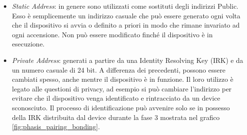 \begin{itemize}
    \item \textit{Static Address}: in genere sono utilizzati come sostituti degli indirizzi Public. Esso è semplicemente un indirizzo casuale che può essere generato ogni volta che il dispositivo si avvia o definito a priori in modo che rimane invariato ad ogni accensione. Non può essere modificato finché il dispositivo è in esecuzione.
    \item \textit{Private Address}: generati a partire da una Identity Resolving Key (IRK) e da un numero casuale di 24 bit. A differenza dei precedenti, possono essere cambiati spesso, anche mentre il dispositivo è in funzione. Il loro utilizzo è legato alle questioni di privacy, ad esempio si può cambiare l'indirizzo per evitare che il dispositivo venga identificato e rintracciato da un device sconosciuto. Il processo di identificazione può avvenire solo se in possesso della IRK distribuita dal device durante la fase 3 mostrata nel grafico \ref{fig:phasis_pairing_bonding}.
\end{itemize}

